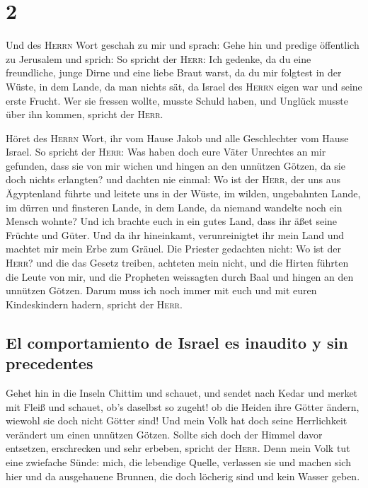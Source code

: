 \hypertarget{section-1}{%
\section{2}\label{section-1}}

 Und des \textsc{Herrn} Wort geschah zu mir und sprach:
 Gehe hin und predige öffentlich zu Jerusalem und sprich:
So spricht der \textsc{Herr}: Ich gedenke, da du eine freundliche, junge
Dirne und eine liebe Braut warst, da du mir folgtest in der Wüste, in
dem Lande, da man nichts sät,  da Israel des
\textsc{Herrn} eigen war und seine erste Frucht. Wer sie fressen wollte,
musste Schuld haben, und Unglück musste über ihn kommen, spricht der
\textsc{Herr}.

 Höret des \textsc{Herrn} Wort, ihr vom Hause Jakob und
alle Geschlechter vom Hause Israel.  So spricht der
\textsc{Herr}: Was haben doch eure Väter Unrechtes an mir gefunden, dass
sie von mir wichen und hingen an den unnützen Götzen, da sie doch nichts
erlangten?  und dachten nie einmal: Wo ist der
\textsc{Herr}, der uns aus Ägyptenland führte und leitete uns in der
Wüste, im wilden, ungebahnten Lande, im dürren und finsteren Lande, in
dem Lande, da niemand wandelte noch ein Mensch wohnte? 
Und ich brachte euch in ein gutes Land, dass ihr äßet seine Früchte und
Güter. Und da ihr hineinkamt, verunreinigtet ihr mein Land und machtet
mir mein Erbe zum Gräuel.  Die Priester gedachten nicht:
Wo ist der \textsc{Herr}? und die das Gesetz treiben, achteten mein
nicht, und die Hirten führten die Leute von mir, und die Propheten
weissagten durch Baal und hingen an den unnützen Götzen. 
Darum muss ich noch immer mit euch und mit euren Kindeskindern hadern,
spricht der \textsc{Herr}.

\hypertarget{el-comportamiento-de-israel-es-inaudito-y-sin-precedentes}{%
\subsection{El comportamiento de Israel es inaudito y sin
precedentes}\label{el-comportamiento-de-israel-es-inaudito-y-sin-precedentes}}

 Gehet hin in die Inseln Chittim und schauet, und sendet
nach Kedar und merket mit Fleiß und schauet, ob's daselbst so zugeht!
 ob die Heiden ihre Götter ändern, wiewohl sie doch nicht
Götter sind! Und mein Volk hat doch seine Herrlichkeit verändert um
einen unnützen Götzen.  Sollte sich doch der Himmel davor
entsetzen, erschrecken und sehr erbeben, spricht der \textsc{Herr}.
 Denn mein Volk tut eine zwiefache Sünde: mich, die
lebendige Quelle, verlassen sie und machen sich hier und da ausgehauene
Brunnen, die doch löcherig sind und kein Wasser geben.

